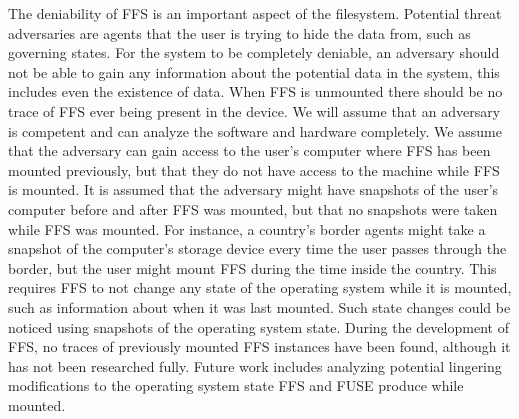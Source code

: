 The deniability of \gls{FFS} is an important aspect of the filesystem. Potential threat adversaries are agents that the user is trying to hide the data from, such as governing states. For the system to be completely deniable, an adversary should not be able to gain any information about the potential data in the system, this includes even the existence of data. When \gls{FFS} is unmounted there should be no trace of \gls{FFS} ever being present in the device. We will assume that an adversary is competent and can analyze the software and hardware completely. We assume that the adversary can gain access to the user's computer where \gls{FFS} has been mounted previously, but that they do not have access to the machine while \gls{FFS} is mounted. It is assumed that the adversary might have snapshots of the user's computer before and after \gls{FFS} was mounted, but that no snapshots were taken while \gls{FFS} was mounted. For instance, a country's border agents might take a snapshot of the computer's storage device every time the user passes through the border, but the user might mount \gls{FFS} during the time inside the country. This requires \gls{FFS} to not change any state of the operating system while it is mounted, such as information about when it was last mounted. Such state changes could be noticed using snapshots of the operating system state. During the development of \gls{FFS}, no traces of previously mounted \gls{FFS} instances have been found, although it has not been researched fully. Future work includes analyzing potential lingering modifications to the operating system state \gls{FFS} and \gls{FUSE} produce while mounted.